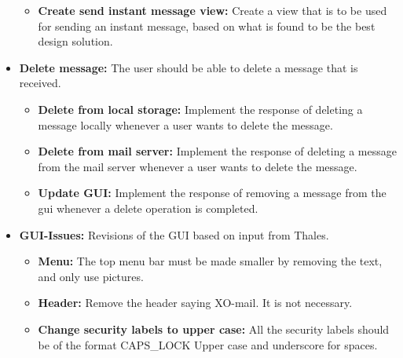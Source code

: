 \begin{itemize}
\begin{itemize}
\item{}\textbf{Create send instant message view:} Create a view that is to be used for sending an instant message, based on what is found to be the best design solution.
\end{itemize}
\item{}\textbf{Delete message:} The user should be able to delete a message that is received.
\begin{itemize}
\item{}\textbf{Delete from local storage:} Implement the response of deleting a message locally whenever a user wants to delete the message.
\item{}\textbf{Delete from mail server:} Implement the response of deleting a message from the mail server whenever a user wants to delete the message.
\item{}\textbf{Update GUI:} Implement the response of removing a message from the gui whenever a delete operation is completed. 
\end{itemize}
\item{}\textbf{GUI-Issues:} Revisions of the GUI based on input from Thales.
\begin{itemize}
\item{}\textbf{Menu:} The top menu bar must be made smaller by removing the text, and only use pictures.
\item{}\textbf{Header:} Remove the header saying XO-mail. It is not necessary.
\item{}\textbf{Change security labels to upper case:} All the security labels should be of the format CAPS\_LOCK Upper case and underscore for spaces.
\end{itemize}
\end{itemize}

